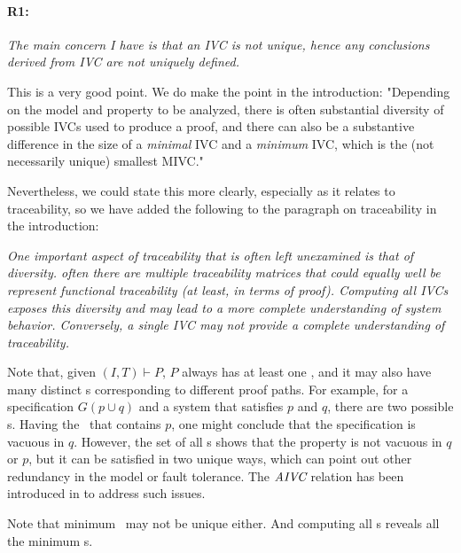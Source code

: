\documentclass{article}
\begin{document}
\newcommand{\true}{\textsc{True}}
\newcommand{\false}{\textsc{False}}

\paragraph{R1:} \textit{The main concern I have is that an IVC is not unique, hence any conclusions derived from IVC are not uniquely defined.}

\vspace{0.05in}

\noindent This is a very good point.  We do make the point in the introduction: "Depending on the model and property to be analyzed, there is often substantial diversity of possible IVCs used to produce a proof, and there can also be a substantive difference in the size of a {\em minimal} IVC and a {\em minimum} IVC, which is the (not necessarily unique) smallest MIVC."

Nevertheless, we could state this more clearly, especially as it relates to traceability, so we have added the following to the paragraph on traceability in the introduction:

\textit{One important aspect of traceability that is often left unexamined is that of diversity. often there are multiple traceability matrices that could equally well be represent functional traceability (at least, in terms of proof).  Computing all IVCs exposes this diversity and may lead to a more complete understanding of system behavior.  Conversely, a single IVC may not provide a complete understanding of traceability.}

Note that, given $(I, T) \vdash P$, $P$ always has at least one \mivc, and it may also have many distinct {\mivc}s corresponding to different proof paths.
For example, for a specification $G(p \cup q)$ and a system that satisfies $p$ and $q$, there are two possible \mivc s. Having the \mivc\ that contains $p$, one might conclude that the specification is vacuous in $q$. However, the set of all \mivc s shows that the property is not vacuous in $q$ or $p$, but it can be satisfied in two unique ways, which can point out other redundancy in the model or fault tolerance. The $\textit{AIVC}$ relation has been introduced in \cite{Murugesan16:renext} to address such issues.

 Note that minimum \mivc\ may not be unique either. And computing all \mivc s reveals all the minimum \mivc s.
\end{document}
